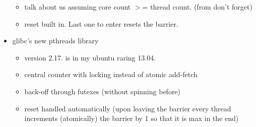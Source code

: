 \documentclass[a4paper, 10pt]{article}
\begin{document}
\begin{itemize}
\begin{itemize}
			\item talk about us assuming core count $>$= thread count. (from don't forget)
			\item reset built in. Last one to enter resets the barrier.
		\end{itemize}
	\item glibc's\cite{glibc} new pthreads library
		\begin{itemize}
			\item version 2.17. is in my ubuntu raring 13.04.
			\item central counter with locking instead of atomic add-fetch
			\item back-off through futexes (without spinning before)
			\item reset handled automatically (upon leaving the barrier every thread increments (atomically) the barrier by 1 so that it is max in the end)
		\end{itemize}
\end{itemize}

\end{document}
